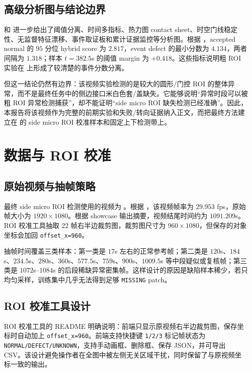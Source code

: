 \documentclass[a4paper,12pt]{article}
\newcommand{\code}[1]{\texttt{#1}}
\begin{document}
\subsection{高级分析图与结论边界}
 和  进一步给出了阈值分离、时间多指标、热力图 contact sheet、时空门线稳定性、无监督特征漂移、事件取证板和累计证据监控等分析图。根据 ，accepted normal 的 $95$ 分位 hybrid score 为 $2.817$，event defect 的最小分数为 $4.134$，两者间隔为 $1.318$；样本 $t=382.5$s 的阈值 margin 为 $+0.418$。这些指标说明粗 ROI 实验在  上形成了较清楚的事件分数分离。

但这一结论仍然有边界：该视频实验检测的是较大的圆形/门控 ROI 的整体异常，而不是最终任务中的侧边接口米白色套/盖缺失。它能够说明“异常时段可以被粗 ROI 异常检测捕获”，却不能证明“side micro ROI 缺失检测已经准确”。因此，本报告将该视频作为完整的前期实验和失败/转向证据纳入正文，而把最终方法建立在  的 side micro ROI 校准样本和固定上下检测带上。
\newpage
\section{数据与 ROI 校准}
\subsection{原始视频与抽帧策略}
最终 side micro ROI 检测使用的视频为 。根据 ，该视频帧率为 $29.953$ fps，原始帧大小为 $1920\times1080$。根据 showcase 输出摘要，视频结尾时间约为 $1091.209$s。ROI 校准工具抽取 $22$ 帧右半边裁剪图，裁剪图尺寸为 $960\times1080$，但保存的对象坐标会加回 \code{offset\_x=960}。

抽帧时间覆盖三类样本：第一类是 $17$s 左右的正常参考帧；第二类是 $120$s、$184$s、$234.5$s、$280$s、$360$s、$577.5$s、$759$s、$900$s、$1009.5$s 等中段疑似或复核帧；第三类是 $1072$s--$1084$s 的后段稀缺异常密集帧。这样设计的原因是缺陷样本稀少，若只均匀采样，训练集中几乎无法得到足够 \code{MISSING} patch。

\subsection{ROI 校准工具设计}
ROI 校准工具的 README 明确说明：前端只显示原视频右半边裁剪图，保存坐标时自动加上 \code{offset\_x=960}。前端支持快捷键 \code{1/2/3} 标记帧状态为 \code{NORMAL/DEFECT/UNKNOWN}，支持手动画框、删除框、保存 JSON，并可导出 CSV。该设计避免操作者在全图中被左侧无关区域干扰，同时保留了与原视频坐标一致的输出。
\end{document}
